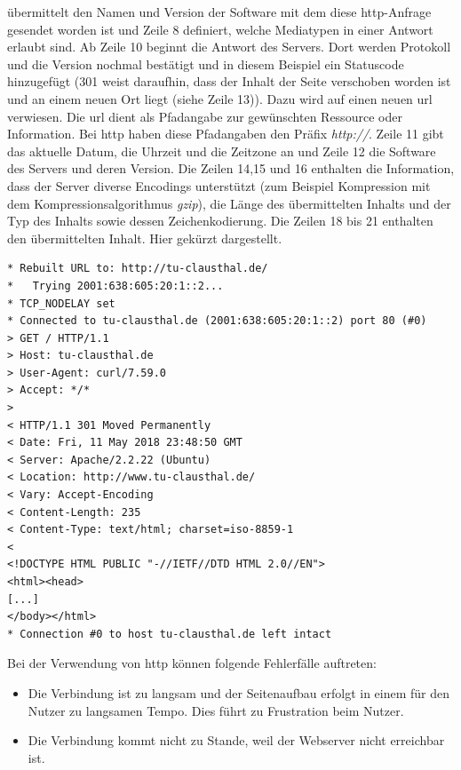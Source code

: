 \documentclass[titlepage]{report}
\begin{document}
übermittelt den Namen und Version der Software mit dem diese
\gls{http}\hyp{}Anfrage gesendet worden ist und Zeile 8 definiert,
welche Mediatypen in einer Antwort erlaubt sind\cite{RFC2616}. Ab Zeile
10 beginnt die Antwort des Servers. Dort werden Protokoll und die
Version nochmal bestätigt und in diesem Beispiel ein Statuscode
hinzugefügt (301 weist daraufhin, dass der Inhalt der Seite verschoben
worden ist und an einem neuen Ort liegt (siehe Zeile 13)). Dazu wird auf
einen neuen \gls{url} verwiesen. Die \gls{url} dient als Pfadangabe zur
gewünschten Ressource oder Information. Bei \gls{http} haben diese
Pfadangaben den Präfix \emph{http://}. Zeile 11 gibt
das aktuelle Datum, die Uhrzeit und die Zeitzone an und Zeile 12 die
Software des Servers und deren Version. Die Zeilen 14,15 und 16
enthalten die Information, dass der Server diverse Encodings unterstützt
(zum Beispiel Kompression mit dem Kompressionsalgorithmus \emph{gzip}),
die Länge des übermittelten Inhalts und der Typ des Inhalts sowie dessen
Zeichenkodierung. Die Zeilen 18 bis 21 enthalten den übermittelten
Inhalt. Hier gekürzt dargestellt.
\begin{minipage}{\linewidth}
\begin{lstlisting}[caption={Eine HTTP-Anfrage an
http://tu-clausthal.de},label={lst:httpanfrage}]
* Rebuilt URL to: http://tu-clausthal.de/
*   Trying 2001:638:605:20:1::2...
* TCP_NODELAY set
* Connected to tu-clausthal.de (2001:638:605:20:1::2) port 80 (#0)
> GET / HTTP/1.1
> Host: tu-clausthal.de
> User-Agent: curl/7.59.0
> Accept: */*
>
< HTTP/1.1 301 Moved Permanently
< Date: Fri, 11 May 2018 23:48:50 GMT
< Server: Apache/2.2.22 (Ubuntu)
< Location: http://www.tu-clausthal.de/
< Vary: Accept-Encoding
< Content-Length: 235
< Content-Type: text/html; charset=iso-8859-1
<
<!DOCTYPE HTML PUBLIC "-//IETF//DTD HTML 2.0//EN">
<html><head>
[...]
</body></html>
* Connection #0 to host tu-clausthal.de left intact
\end{lstlisting}
\end{minipage}
Bei der Verwendung von \gls{http} können folgende Fehlerfälle auftreten:
\begin{itemize}
    \item Die Verbindung ist zu langsam und der Seitenaufbau erfolgt in
          einem für den Nutzer zu langsamen Tempo. Dies führt zu
          Frustration beim Nutzer.
    \item Die Verbindung kommt nicht zu Stande, weil der Webserver nicht
          erreichbar ist.
\end{itemize}
\end{document}
